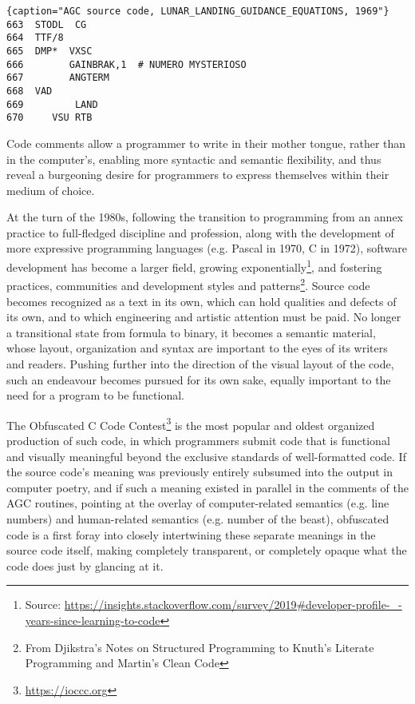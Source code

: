 \documentclass{article}
\begin{document}
\begin{lstlisting}{caption="AGC source code, LUNAR_LANDING_GUIDANCE_EQUATIONS, 1969"}
663  STODL  CG
664	 TTF/8
665  DMP*  VXSC
666	       GAINBRAK,1  # NUMERO MYSTERIOSO
667        ANGTERM
668	 VAD
669		    LAND
670     VSU	RTB
\end{lstlisting}

Code comments allow a programmer to write in their mother tongue, rather than in the computer's, enabling more syntactic and semantic flexibility, and thus reveal a burgeoning desire for programmers to express themselves within their medium of choice.

At the turn of the 1980s, following the transition to programming from an annex practice to full-fledged discipline and profession, along with the development of more expressive programming languages (e.g. Pascal in 1970, C in 1972), software development has become a larger field, growing exponentially\footnote{Source: \url{https://insights.stackoverflow.com/survey/2019#developer-profile-_-years-since-learning-to-code}}, and fostering practices, communities and development styles and patterns\footnote{From Djikstra's Notes on Structured Programming to Knuth's Literate Programming and Martin's Clean Code}. Source code becomes recognized as a text in its own, which can hold qualities and defects of its own, and to which engineering and artistic attention must be paid. No longer a transitional state from formula to binary, it becomes a semantic material, whose layout, organization and syntax are important to the eyes of its writers and readers. Pushing further into the direction of the visual layout of the code, such an endeavour becomes pursued for its own sake, equally important to the need for a program to be functional.

The Obfuscated C Code Contest\footnote{\url{https://ioccc.org}} is the most popular and oldest organized production of such code, in which programmers submit code that is functional and visually meaningful beyond the exclusive standards of well-formatted code. If the source code's meaning was previously entirely subsumed into the output in computer poetry, and if such a meaning existed in parallel in the comments of the AGC routines, pointing at the overlay of computer-related semantics (e.g. line numbers) and human-related semantics (e.g. number of the beast), obfuscated code is a first foray into closely intertwining these separate meanings in the source code itself, making completely transparent, or completely opaque what the code does just by glancing at it.
\end{document}
